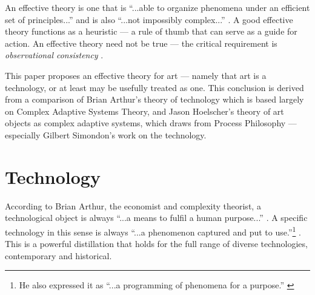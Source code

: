 \documentclass[letterpaper]{article}
\begin{document}
    An effective theory is one that is “...able to organize phenomena under an efficient set of principles...” and is also “...not impossibly complex...” \citep[p.1]{WellsEffctvThrs2012}. A good effective theory functions as a heuristic — a rule of thumb that can serve as a guide for action. An effective theory need not be true — the critical requirement is \emph{observational consistency} \citep[p.71]{WellsEffctvThrs2012}.

    This paper proposes an effective theory for art — namely that art is a technology, or at least may be usefully treated as one. This conclusion is derived from a comparison of Brian Arthur's theory of technology which is based largely on Complex Adaptive Systems Theory, and Jason Hoelscher's theory of art objects as complex adaptive systems, which draws from Process Philosophy — especially Gilbert Simondon's work on the technology.



\section{Technology}

    According to Brian Arthur, the economist and complexity theorist, a technological object is always “...a means to fulfil a human purpose...” \citep[p.28]{theNatureOfTechnology2009}. A specific technology in this sense is always “...a phenomenon captured and put to use.”\footnote{
        He also expressed it as “...a programming of phenomena for a purpose.” \citep[p.53]{theNatureOfTechnology2009}
    } \citep[p.53]{theNatureOfTechnology2009}. This is a powerful distillation that holds for the full range of diverse technologies, contemporary and historical.
\end{document}
